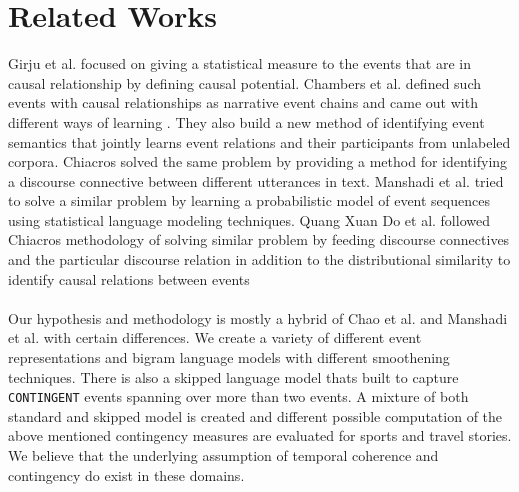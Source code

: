 \documentclass[12pt]{article}
\begin{document}
\section{Related Works}
Girju et al. focused on giving a statistical measure to the events that are in causal  relationship by defining causal potential\cite{cp}. Chambers et al. defined such events with causal relationships as narrative event chains and came out with different ways of learning \cite{nec}. They also build a new method of identifying event semantics that jointly learns event relations and their participants from unlabeled corpora\cite{cloze}. Chiacros solved the same problem by providing a method for identifying a discourse connective between different utterances in text\cite{chiacro}. Manshadi et al. tried to solve a similar problem by learning a probabilistic model of event sequences using statistical language modeling techniques\cite{manshadi}. Quang Xuan Do et al. followed Chiacros methodology of solving similar problem by feeding discourse connectives and the particular discourse relation in addition to the distributional similarity to identify causal relations between events\cite{do}\\
\smallskip \\
Our hypothesis and methodology is mostly a hybrid of Chao et al. and Manshadi et al. with certain differences. We create a variety of different event representations and bigram language models with different smoothening techniques. There is also a skipped language model thats built to capture \texttt{CONTINGENT} events spanning over more than two events. A mixture of both standard and skipped model is created and different possible computation of the above mentioned contingency measures are evaluated for sports and travel stories. We believe that the underlying assumption of temporal coherence and contingency do exist in these domains.  \\
\medskip \\
\end{document}
